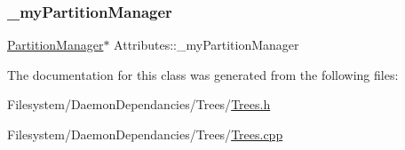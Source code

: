 \subsubsection{\texorpdfstring{\+\_\+my\+Partition\+Manager}{\_myPartitionManager}}
{\footnotesize\ttfamily \mbox{\hyperlink{class_partition_manager}{Partition\+Manager}}$\ast$ Attributes\+::\+\_\+my\+Partition\+Manager\hspace{0.3cm}{\ttfamily [private]}}



The documentation for this class was generated from the following files\+:\begin{DoxyCompactItemize}
\item 
Filesystem/\+Daemon\+Dependancies/\+Trees/\mbox{\hyperlink{_trees_8h}{Trees.\+h}}\item 
Filesystem/\+Daemon\+Dependancies/\+Trees/\mbox{\hyperlink{_trees_8cpp}{Trees.\+cpp}}\end{DoxyCompactItemize}
